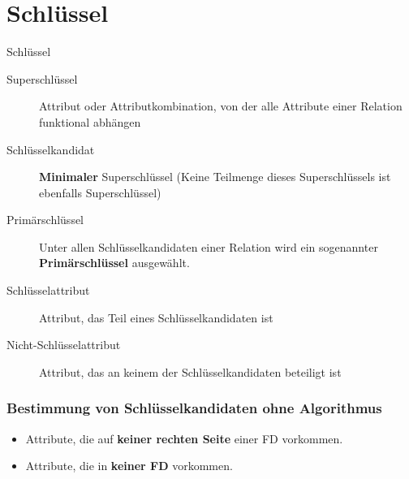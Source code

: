 \documentclass{lehramt-informatik}
\begin{document}
%

\chapter{Schlüssel}

\begin{lernkartei}{Schlüssel}
\begin{description}
\item[Superschlüssel] Attribut oder Attributkombination, von
der alle Attribute einer Relation funktional abhängen

\item[Schlüsselkandidat] \textbf{Minimaler} Superschlüssel
(Keine Teilmenge dieses Superschlüssels ist ebenfalls Superschlüssel)

\item[Primärschlüssel] Unter allen Schlüsselkandidaten einer
Relation wird ein sogenannter \textbf{Primärschlüssel} ausgewählt.

\item[Schlüsselattribut] Attribut, das Teil eines
Schlüsselkandidaten ist

\item[Nicht-Schlüsselattribut] Attribut, das an keinem der
Schlüsselkandidaten beteiligt ist
\end{description}
\end{lernkartei}

%

\subsection{Bestimmung von Schlüsselkandidaten ohne Algorithmus}

\begin{itemize}
\item Attribute, die auf \textbf{keiner rechten Seite} einer FD
vorkommen.

\item Attribute, die in \textbf{keiner FD} vorkommen.
\end{itemize}

%
\end{document}
